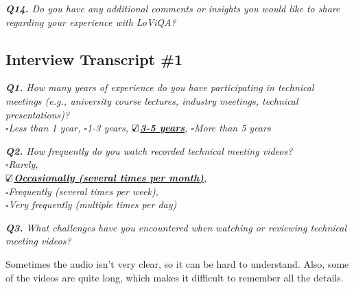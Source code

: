 \vspace*{1em}
\noindent\textit{\textbf{Q14.} Do you have any additional comments or insights you would like to share regarding your experience with LoViQA?
}



%

\vspace*{.6cm}


\noindent\hrulefill 

\newpage
\subsection{Interview Transcript \#1}
\label{appendix:transcript1}


\vspace*{1em}\noindent\textit{\textbf{Q1.} How many years of experience do you have participating in technical meetings (e.g., university course lectures, industry meetings, technical presentations)?
\\[.5em]
        \indent $\square$Less than 1 year,
        $\square$1-3 years,
        \underline{\bfseries$\text{\rlap{$\checkmark$}}\square$3-5 years},
        $\square$More than 5 years
}


\vspace*{1em}\noindent\textit{\textbf{Q2.} How frequently do you watch recorded technical meeting videos?
\\[.5em]
        \indent $\square$Rarely,\\
        \indent\underline{\bfseries$\text{\rlap{$\checkmark$}}\square$Occasionally (several times per month)},\\
        \indent$\square$Frequently (several times per week),\\
        \indent$\square$Very frequently (multiple times per day)
}

\vspace*{1em}\noindent\textit{\textbf{Q3.} What challenges have you encountered when watching or reviewing technical meeting videos? 
}

\begin{samepage}
\begin{mdframed}[style=MyFrame]
Sometimes the audio isn’t very clear, so it can be hard to understand. Also, some of the videos are quite long, which makes it difficult to remember all the details.
\end{mdframed}
\end{samepage}

